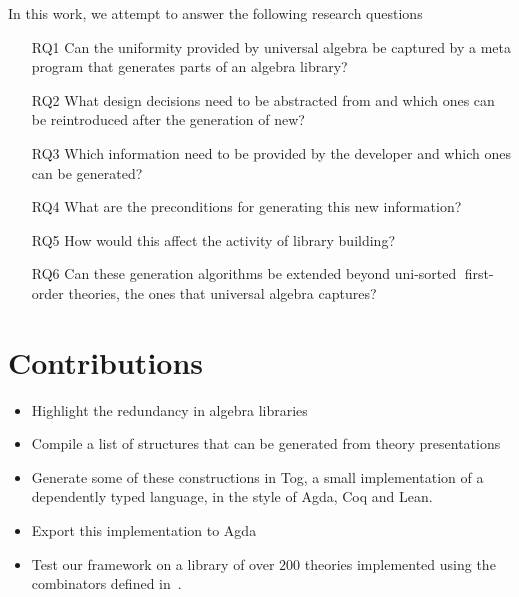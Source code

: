 
In this work, we attempt to answer the following research questions 
\begin{enumerate}
    \item[RQ1] Can the uniformity provided by universal algebra be captured by a meta program that generates parts of an algebra library?
    \item[RQ2] What design decisions need to be abstracted from and which ones can be reintroduced after the generation of new?
    \item[RQ3] Which information need to be provided by the developer and which ones can be generated? 
    \item[RQ4] What are the preconditions for generating this new information? 
    \item[RQ5] How would this affect the activity of library building?
    \item[RQ6] Can these generation algorithms be extended beyond uni-sorted first-order theories, the ones that universal algebra captures? 
\end{enumerate}

\section{Contributions}
\begin{itemize}
    \item Highlight the redundancy in algebra libraries
    \item Compile a list of structures that can be generated from theory presentations
    \item Generate some of these constructions in Tog, a small implementation of a dependently typed language, in the style of Agda, Coq and Lean. 
    \item Export this implementation to Agda 
    \item Test our framework on a library of over $200$ theories implemented using the combinators defined in~\cite{carette2018building}. 
\end{itemize}  

